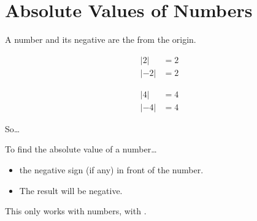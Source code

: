 \section{Absolute Values of Numbers}

A number and its negative are the   from the origin.
\begin{tcbraster}[
    raster columns=2,
    raster before skip = 1em, raster after skip = 1em,
    ]
    \begin{tcolorbox}[colback=white,]
        \vspace{2\baselineskip}
        \begin{align*}
            |2| &= 2\\
            |-2| &= 2
        \end{align*}
    \end{tcolorbox}
    \begin{tcolorbox}[colback=white,]
        \vspace{2\baselineskip}
        \begin{align*}
            |4| &= 4\\
            |-4| &= 4
        \end{align*}
    \end{tcolorbox}
\end{tcbraster}

So\dots

\begin{myConcept}{To find the absolute value of a number\dots}
    \begin{itemize}
        \item {} the negative sign (if any) in front of the number.
        \item The result will  be negative.
    \end{itemize}
    \begin{tcolorbox}[center,width=5.5in,]
        \centering
        This only works with numbers,  with .
    \end{tcolorbox}
\end{myConcept}

